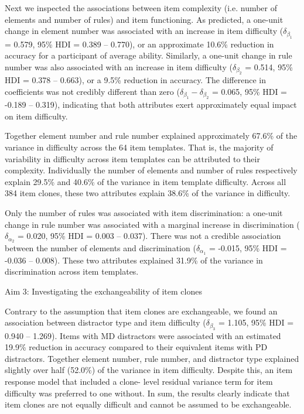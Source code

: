 \documentclass[a4paper,man,natbib]{apa6}
\makeatletter
\renewcommand{\subsubsection}{\@startsection{subsubsection}{3}
  {\z@}%
  {\b@level@two@skip}{\e@level@two@skip}%
  {\normalfont\normalsize\bfseries}}
\makeatother
\begin{document}
Next we inspected the associations between item complexity (i.e. number of elements and number of rules) and item functioning. As predicted, a one-unit change in element number was associated with an increase in item difficulty ($\delta_{\beta_1}$ = 0.579, 95\% HDI = 0.389 -- 0.770), or an approximate 10.6\% reduction in accuracy for a participant of average ability. Similarly, a one-unit change in rule number was also associated with an increase in item difficulty ($\delta_{\beta_2}$ = 0.514, 95\% HDI = 0.378 -- 0.663), or a 9.5\% reduction in accuracy. The difference in coefficients was not credibly different than zero ($\delta_{\beta_1} - \delta_{\beta_2}$ = 0.065, 95\% HDI = -0.189 -- 0.319), indicating that both attributes exert approximately equal impact on item difficulty.

Together element number and rule number explained approximately 67.6\% of the variance in difficulty across the 64 item templates. That is, the majority of variability in difficulty across item templates can be attributed to their complexity. Individually the number of elements and number of rules respectively explain 29.5\% and 40.6\% of the variance in item template difficulty. Across all 384 item clones, these two attributes explain 38.6\% of the variance in difficulty.

Only the number of rules was associated with item discrimination: a one-unit change in rule number was associated with a marginal increase in discrimination ($\delta_{\alpha_2}$ = 0.020, 95\% HDI = 0.003 -- 0.037). There was not a credible association between the number of elements and discrimination ($\delta_{\alpha_1}$ = -0.015, 95\% HDI = -0.036 -- 0.008). These two attributes explained 31.9\% of the variance in discrimination across item templates. 

\subsubsection{Aim 3: Investigating the exchangeability of item clones}

Contrary to the assumption that item clones are exchangeable, we found an association between distractor type and item difficulty ($\delta_{\beta_3}$ = 1.105, 95\% HDI = 0.940 -- 1.269). Items with MD distractors were associated with an estimated 19.9\% reduction in accuracy compared to their equivalent items with PD distractors. Together element number, rule number, and distractor type explained slightly over half (52.0\%) of the variance in item difficulty. Despite this, an item response model that included a clone- level residual variance term for item difficulty was preferred to one without. In sum, the results clearly indicate that item clones are not equally difficult and cannot be assumed to be exchangeable. 
\end{document}

